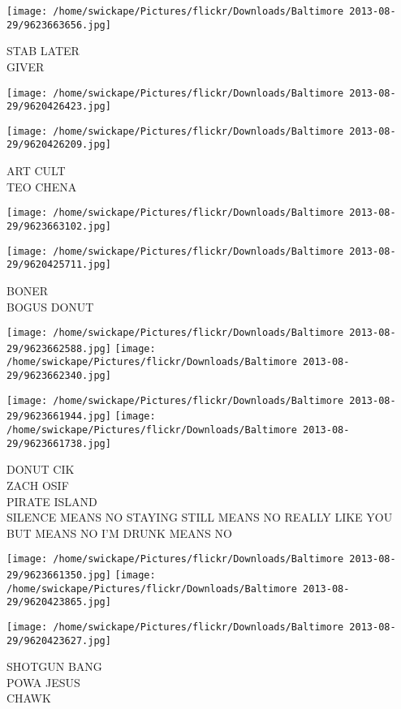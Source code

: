 \documentclass[10pt,letterpaper]{article}
\begin{document}
\vspace{0.25in}
\texttt{[image: /home/swickape/Pictures/flickr/Downloads/Baltimore 2013-08-29/9623663656.jpg]}

STAB LATER\\
GIVER
\pagebreak

\texttt{[image: /home/swickape/Pictures/flickr/Downloads/Baltimore 2013-08-29/9620426423.jpg]}

\vspace{0.25in}
\texttt{[image: /home/swickape/Pictures/flickr/Downloads/Baltimore 2013-08-29/9620426209.jpg]}

ART CULT\\
TEO CHENA
\pagebreak

\texttt{[image: /home/swickape/Pictures/flickr/Downloads/Baltimore 2013-08-29/9623663102.jpg]}

\vspace{0.25in}
\texttt{[image: /home/swickape/Pictures/flickr/Downloads/Baltimore 2013-08-29/9620425711.jpg]}

BONER\\
BOGUS DONUT
\pagebreak

\texttt{[image: /home/swickape/Pictures/flickr/Downloads/Baltimore 2013-08-29/9623662588.jpg]}
\texttt{[image: /home/swickape/Pictures/flickr/Downloads/Baltimore 2013-08-29/9623662340.jpg]}

\texttt{[image: /home/swickape/Pictures/flickr/Downloads/Baltimore 2013-08-29/9623661944.jpg]}
\texttt{[image: /home/swickape/Pictures/flickr/Downloads/Baltimore 2013-08-29/9623661738.jpg]}

DONUT CIK\\
ZACH OSIF\\
PIRATE ISLAND\\
SILENCE MEANS NO STAYING STILL MEANS NO REALLY LIKE YOU BUT MEANS NO I'M DRUNK MEANS NO
\pagebreak

\texttt{[image: /home/swickape/Pictures/flickr/Downloads/Baltimore 2013-08-29/9623661350.jpg]}
\texttt{[image: /home/swickape/Pictures/flickr/Downloads/Baltimore 2013-08-29/9620423865.jpg]}

\vspace{0.25in}
\texttt{[image: /home/swickape/Pictures/flickr/Downloads/Baltimore 2013-08-29/9620423627.jpg]}

SHOTGUN BANG\\
POWA JESUS\\
CHAWK
\pagebreak
\end{document}
